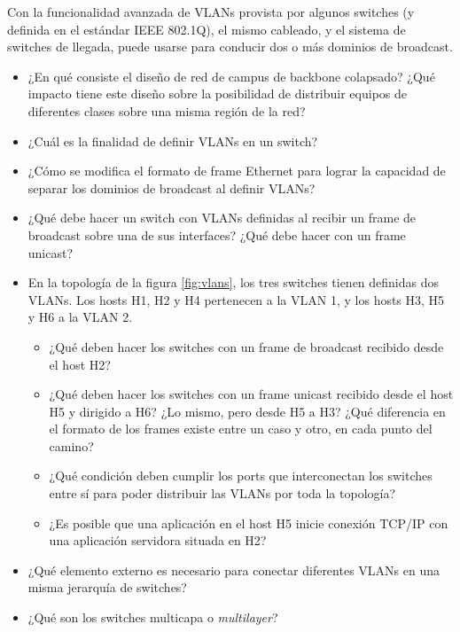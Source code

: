 
Con la funcionalidad avanzada de VLANs provista por algunos switches (y definida en el estándar IEEE 802.1Q), el mismo cableado, y el sistema de switches de llegada, puede usarse para conducir dos o más dominios de broadcast. 
 
\begin{itemize}


	\item ¿En qué consiste el diseño de red de campus de backbone colapsado? ¿Qué impacto tiene este diseño sobre la posibilidad de distribuir equipos de diferentes clases sobre una misma región de la red?
	\item 
¿Cuál es la finalidad de definir VLANs en un switch? 

	\item 
¿Cómo se modifica el formato de frame Ethernet para lograr la capacidad de separar los dominios de broadcast al definir VLANs?

	\item ¿Qué debe hacer un switch con VLANs definidas al recibir un frame de broadcast sobre una de sus interfaces? ¿Qué debe hacer con un frame unicast?

	\item En la topología de la figura \ref{fig:vlans}, los tres switches tienen definidas dos VLANs. Los hosts H1, H2 y H4 pertenecen a la VLAN 1, y los hosts H3, H5 y H6 a la VLAN 2. 

	\begin{itemize}
		\item ¿Qué deben hacer los switches con un frame de broadcast recibido desde el host H2?
		\item ¿Qué deben hacer los switches con un frame unicast recibido desde el host H5 y dirigido a H6? ¿Lo mismo, pero desde H5 a H3? ¿Qué diferencia en el formato de los frames existe entre un caso y otro, en cada punto del camino?
		\item ¿Qué condición deben cumplir los ports que interconectan los switches entre sí para poder distribuir las VLANs por toda la topología?
		\item ¿Es posible que una aplicación en el host H5 inicie conexión TCP/IP con una aplicación servidora situada en H2? 
	\end{itemize} 

\item ¿Qué elemento externo es necesario para conectar diferentes VLANs en una misma jerarquía de switches? 

\item ¿Qué son los switches multicapa o \emph{multilayer}? 

\end{itemize} 







